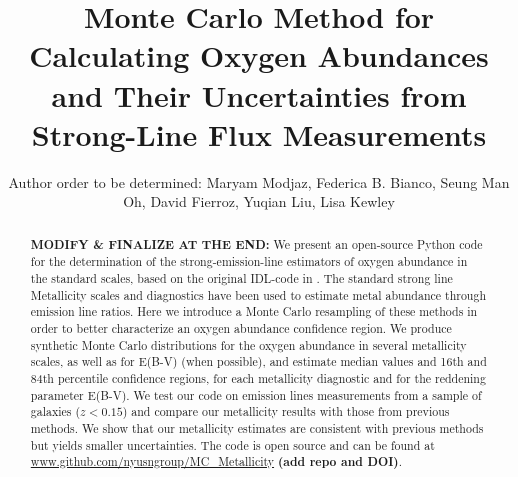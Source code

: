 \documentclass{emulateapj}
\begin{document}
\title{Monte Carlo Method for Calculating Oxygen Abundances and Their Uncertainties from Strong-Line Flux Measurements}

\author{Author order to be determined: Maryam Modjaz, Federica B. Bianco, Seung Man Oh, David Fierroz, Yuqian Liu, Lisa Kewley}
 
 
\begin{abstract}
\textbf{MODIFY \& FINALIZE AT THE END:} We present an open-source Python code for the determination of the strong-emission-line estimators of oxygen abundance in the standard scales, based on the original IDL-code in \citet{kewley02}. The standard strong line Metallicity scales and diagnostics  have been used to estimate metal abundance through emission line ratios. Here we introduce a Monte Carlo resampling of these methods in order to better characterize an oxygen abundance confidence region.  We  produce synthetic Monte Carlo distributions for the oxygen abundance in several metallicity scales, as well as for E(B-V)  (when possible), and estimate median values and 16th and 84th percentile confidence regions, for each metallicity diagnostic and for the reddening parameter E(B-V). We test our code on emission lines measurements from a sample of galaxies ($z<0.15$) and compare our metallicity results with those from previous methods. We show that our metallicity estimates are consistent with previous methods but yields smaller uncertainties. The code is open source and can be found at \url{www.github.com/nyusngroup/MC_Metallicity} \textbf{(add repo and DOI)}.
\end{abstract}
 
\end{document}
